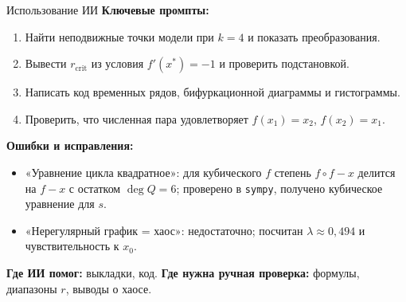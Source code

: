 \documentclass[aspectratio=169,10pt]{beamer}
\newcommand{\rc}{r_{\mathrm{crit}}}
\begin{document}
\begin{frame}{Использование ИИ}
\small\textbf{Ключевые промпты:}
\begin{enumerate}
\item Найти неподвижные точки модели при $k=4$ и показать преобразования.
\item Вывести $\rc$ из условия $f'(x^*)=-1$ и проверить подстановкой.
\item Написать код временных рядов, бифуркационной диаграммы и гистограммы.
\item Проверить, что численная пара удовлетворяет $f(x_1)=x_2$, $f(x_2)=x_1$.
\end{enumerate}
\textbf{Ошибки и исправления:}
\begin{itemize}
\item «Уравнение цикла квадратное»: для кубического $f$ степень $f\circ f-x$ делится на $f-x$ с остатком $\deg Q=6$; проверено в \texttt{sympy}, получено кубическое уравнение для $s$.
\item «Нерегулярный график = хаос»: недостаточно; посчитан $\lambda\approx0{,}494$ и чувствительность к $x_0$.
\end{itemize}
\textbf{Где ИИ помог:} выкладки, код. \textbf{Где нужна ручная проверка:} формулы, диапазоны $r$, выводы о хаосе.
\end{frame}
\end{document}
